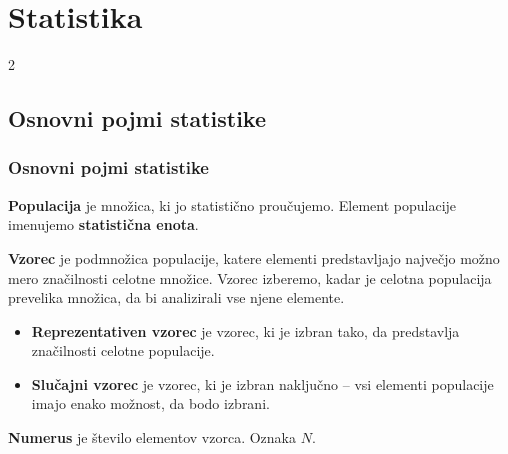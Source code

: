 \section{Statistika}

\begin{frame}
    \sectionpage
\end{frame}

\begin{frame}
    \begin{multicols}{2}
    \end{multicols}
\end{frame}


    \subsection{Osnovni pojmi statistike}

        \begin{frame}
            \frametitle{Osnovni pojmi statistike}

            \begin{alertblock}{}
                \textbf{Populacija} je množica, ki jo statistično proučujemo. 
                Element populacije imenujemo \textbf{statistična enota}. 
            \end{alertblock}
            
            \begin{alertblock}{}
                \textbf{Vzorec} je podmnožica populacije, katere elementi predstavljajo največjo možno mero značilnosti celotne množice. 
                Vzorec izberemo, kadar je celotna populacija prevelika množica, da bi analizirali vse njene elemente. \\
                
                \begin{itemize}
                    \item \textbf{Reprezentativen vzorec} je vzorec, ki je izbran tako, da predstavlja značilnosti celotne populacije.
                    \item \textbf{Slučajni vzorec} je vzorec, ki je izbran naključno -- vsi elementi populacije imajo enako možnost, da bodo izbrani.
                \end{itemize}

                \textbf{Numerus} je število elementov vzorca. Oznaka $N$. 
            \end{alertblock}

        \end{frame}    


